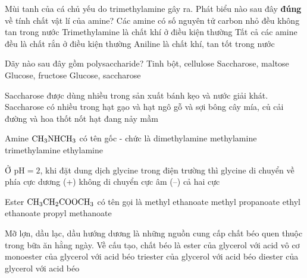 \documentclass[11pt,a4paper]{article}
\begin{document}
\begin{ex}
Mùi tanh của cá chủ yếu do trimethylamine gây ra. Phát biểu nào sau đây \textbf{đúng} về tính chất vật lí của amine?
\choice
{Các amine có số nguyên tử carbon nhỏ đều không tan trong nước}
{\True Trimethylamine là chất khí ở điều kiện thường}
{Tất cả các amine đều là chất rắn ở điều kiện thường}
{Aniline là chất khí, tan tốt trong nước}

\end{ex}

\begin{ex}
Dãy nào sau đây gồm polysaccharide?
\choice
{\True Tinh bột, cellulose}
{Saccharose, maltose}
{Glucose, fructose}
{Glucose, saccharose}

\end{ex}

\begin{ex}
Saccharose được dùng nhiều trong sản xuất bánh kẹo và nước giải khát. Saccharose có nhiều trong
\choice
{hạt gạo và hạt ngô}
{gỗ và sợi bông}
{\True cây mía, củ cải đường và hoa thốt nốt}
{hạt đang nảy mầm}

\end{ex}

\begin{ex}
Amine $\ce{CH3NHCH3}$ có tên gốc - chức là
\choice
{\True dimethylamine}
{methylamine}
{trimethylamine}
{ethylamine}

\end{ex}

\begin{ex}
Ở $\text{pH} = 2$, khi đặt dung dịch glycine trong điện trường thì glycine di chuyển về phía
\choice
{cực dương (+)}
{không di chuyển}
{\True cực âm (--)}
{cả hai cực}

\end{ex}

\begin{ex}
Ester $\ce{CH3CH2COOCH3}$ có tên gọi là
\choice
{methyl ethanoate}
{\True methyl propanoate}
{ethyl ethanoate}
{propyl methanoate}

\end{ex}

\begin{ex}
Mỡ lợn, dầu lạc, dầu hướng dương là những nguồn cung cấp chất béo quen thuộc trong bữa ăn hằng ngày. Về cấu tạo, chất béo là
\choice
{ester của glycerol với acid vô cơ}
{monoester của glycerol với acid béo}
{\True triester của glycerol với acid béo}
{diester của glycerol với acid béo}

\end{ex}
\end{document}
